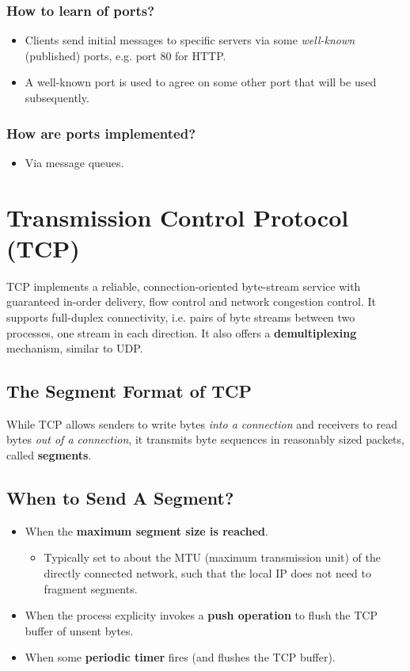\documentclass[11pt]{article}
\begin{document}
\subsubsection{How to learn of ports?}
\label{sec:org686f5f0}
\begin{itemize}
\item Clients send initial messages to specific servers via some \emph{well-known} (published) ports, e.g. port 80 for HTTP.
\item A well-known port is used to agree on some other port that will be used subsequently.
\end{itemize}
\subsubsection{How are ports implemented?}
\label{sec:org3420aa9}
\begin{itemize}
\item Via message queues.
\end{itemize}

\section{Transmission Control Protocol (TCP)}
\label{sec:org69efa5b}
TCP implements a reliable, connection-oriented byte-stream service with guaranteed in-order delivery, flow control and network congestion control.
It supports full-duplex connectivity, i.e. pairs of byte streams between two processes, one stream in each direction.
It also offers a \textbf{demultiplexing} mechanism, similar to UDP.

\subsection{The Segment Format of TCP}
\label{sec:org1e8fa1b}
While TCP allows senders to write bytes \emph{into a connection} and receivers to read bytes \emph{out of a connection}, it transmits byte sequences in reasonably sized packets, called \textbf{segments}.

\subsection{When to Send A Segment?}
\label{sec:org23e9dd1}
\begin{itemize}
\item When the \textbf{maximum segment size is reached}.
\begin{itemize}
\item Typically set to about the MTU (maximum transmission unit) of the directly connected network, such that the local IP does not need to fragment segments.
\end{itemize}
\item When the process explicity invokes a \textbf{push operation} to flush the TCP buffer of unsent bytes.
\item When some \textbf{periodic timer} fires (and flushes the TCP buffer).
\end{itemize}
\end{document}
